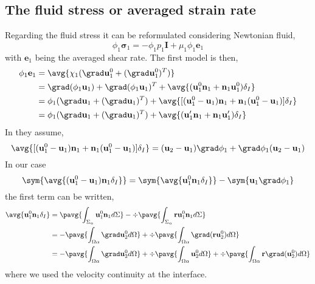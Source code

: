 \subsection{The fluid stress or averaged strain rate}
Regarding the fluid stress it can be reformulated considering Newtonian fluid,
\begin{equation}
    \phi_1 \bm{\sigma}_1 
    = - \phi_1 p_1 \textbf{I}
    + \mu_1 \phi_1 \textbf{e}_1
\end{equation}
with $\textbf{e}_1$ being the averaged shear rate. 
The first model is then, 
\begin{align*}
    \phi_1 \textbf{e}_1
    &= \avg{\chi_1 (\grad \textbf{u}_1^0+(\grad \textbf{u}_1^0)^T)}\\
    &= \grad (\phi_1\textbf{u}_1)+ \grad (\phi_1\textbf{u}_1)^T
    + \avg{(\textbf{u}_1^0  \textbf{n}_1 +  \textbf{n}_1\textbf{u}_1^0)\delta_I}\\
    &= \phi_1 (\grad \textbf{u}_1+ (\grad \textbf{u}_1)^T)
    + \avg{[(\textbf{u}_1^0 - \textbf{u}_1)  \textbf{n}_1 +  \textbf{n}_1(\textbf{u}_1^0 - \textbf{u}_1 )]\delta_I}\\
    &= \phi_1 (\grad \textbf{u}_1+ (\grad \textbf{u}_1)^T)
    + \avg{(\textbf{u}_1' \textbf{n}_1 +  \textbf{n}_1\textbf{u}_1')\delta_I}\\
\end{align*}
In \citet[chap 9]{ishii2010thermo} they assume,
\begin{equation}
    \avg{[(\textbf{u}_1^0 - \textbf{u}_1)  \textbf{n}_1 +  \textbf{n}_1(\textbf{u}_1^0 - \textbf{u}_1 )]\delta_I}\\
    = 
    (\textbf{u}_2 - \textbf{u}_1)  \grad \phi_1 +  \grad \phi_1(\textbf{u}_2 - \textbf{u}_1 )\\
\end{equation}
In our case 
\begin{equation}
    \sym{\avg{(\textbf{u}_1^0 - \textbf{u}_1)  \textbf{n}_1\delta_I } }\\
    = 
    \sym{\avg{\textbf{u}_1^0  \textbf{n}_1\delta_I  } }\\
    - \sym{\textbf{u}_1 \grad \phi_1 }\\
\end{equation}
the first term can be written, 
\begin{align}
    \avg{\textbf{u}_1^0  \textbf{n}_1\delta_I  }
    &=
    \pavg{\int_{\Sigma_\alpha} \textbf{u}_1^0  \textbf{n}_1 d\Sigma  }
    -\div \pavg{\int_{\Sigma_\alpha} \textbf{r}\textbf{u}_1^0  \textbf{n}_1 d\Sigma  }\\
    &=
    - \pavg{\int_{\Omega\alpha} \grad \textbf{u}_2^0   d\Omega   }
    + \div \pavg{\int_{\Omega\alpha} \grad (\textbf{ru}_2^0 )  d\Omega   }\\
    &=
    - \pavg{\int_{\Omega\alpha} \grad \textbf{u}_2^0   d\Omega   }
    + \div\pavg{\int_{\Omega\alpha} \textbf{u}_2^0   d\Omega   }
    + \div\pavg{\int_{\Omega\alpha} \textbf{r} \grad (\textbf{u}_2^0 )  d\Omega   }
\end{align}
where we used the velocity continuity at the interface. 

